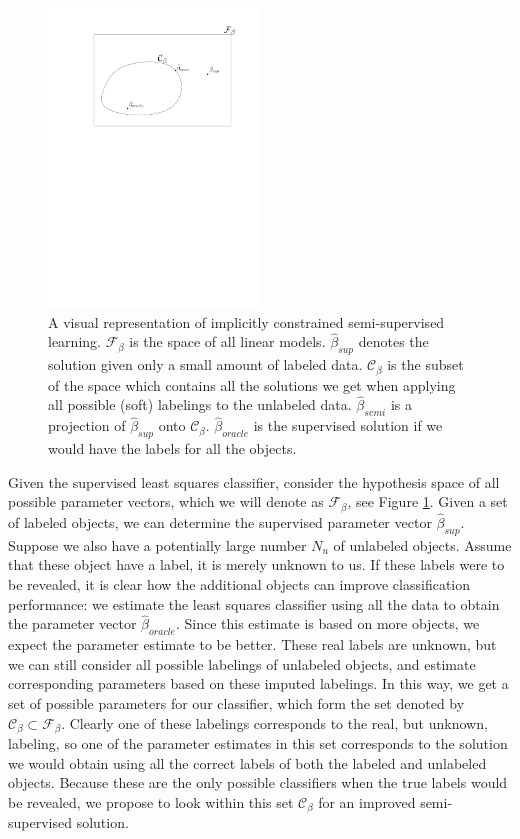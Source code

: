 \documentclass{elsarticle}
\begin{document}
\begin{figure}[ht] 
  \centering
      \includegraphics[width=0.5\textwidth]{constrainedspace.pdf}
  \caption{A visual representation of implicitly constrained semi-supervised learning. $\mathcal{F}_{\beta}$ is the space of all linear models. $\hat{\beta}_{sup}$ denotes the solution given only a small amount of labeled data. $\mathcal{C}_{\beta}$ is the subset of the space which contains all the solutions we get when applying all possible (soft) labelings to the unlabeled data. $\hat{\beta}_{semi}$ is a projection of $\hat{\beta}_{sup}$ onto $\mathcal{C}_{\beta}$. $\hat{\beta}_{oracle}$ is the supervised solution if we would have the labels for all the objects.} \label{fig:constrainedsubset}
\end{figure}

Given the supervised least squares classifier, consider the hypothesis space of all possible parameter vectors, which we will denote as $\mathcal{F}_{\beta}$, see Figure \ref{fig:constrainedsubset}. Given a set of labeled objects, we can determine the supervised parameter vector $\hat{\beta}_{sup}$. Suppose we also have a potentially large number $N_u$ of unlabeled objects. Assume that these object have a label, it is merely unknown to us. If these labels were to be revealed, it is clear how the additional objects can improve classification performance: we estimate the least squares classifier using all the data to obtain the parameter vector $\hat{\beta}_{oracle}$. Since this estimate is based on more objects, we expect the parameter estimate to be better. These real labels are unknown, but we can still consider all possible labelings of unlabeled objects, and estimate corresponding parameters based on these imputed labelings. In this way, we get a set of possible parameters for our classifier, which form the set denoted by $\mathcal{C}_{\beta} \subset \mathcal{F}_{\beta}$. Clearly one of these labelings corresponds to the real, but unknown, labeling, so one of the parameter estimates in this set corresponds to the solution we would obtain using all the correct labels of both the labeled and unlabeled objects. Because these are the only possible classifiers when the true labels would be revealed, we propose to look within this set $\mathcal{C}_{\beta}$ for an improved semi-supervised solution. 
\end{document}

